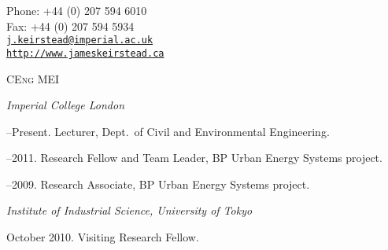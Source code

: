 \documentclass[11pt,a4paper]{article}
\makeatletter
\def\myemail{j.keirstead@imperial.ac.uk}
\def\myweb{http://www.jameskeirstead.ca}
\def\myphone{+44 (0) 207 594 6010}
\def\myfax{+44 (0) 207 594 5934}
\makeatother
\begin{document}
\begin{minipage}[t]{2.95in}
\end{minipage}
\hfill     
\hfill
\begin{minipage}[t]{1.7in}
  \flushright \footnotesize Phone: \myphone \\ 
  Fax: \myfax  \\ 
  {\scriptsize  \texttt{\href{mailto:\myemail}{\myemail}}} \\
  {\scriptsize  \texttt{\href{\myweb}{\myweb}}}
\end{minipage}


\bigskip

\bigskip

 {\scriptsize \textsc{CEng MEI}}
\reversemarginpar
\raggedright

\bigskip

\bigskip


\noindent{}%
%
\emph{Imperial College London \vspace{0.01in}}

--Present. Lecturer, Dept.\ of Civil and Environmental Engineering.      

--2011. Research Fellow and Team Leader, BP Urban Energy Systems project.

--2009. Research Associate, BP Urban Energy Systems project. \vspace{0.02in}

\medskip

\emph{Institute of Industrial Science, University of Tokyo \vspace{0.01in}}

\ind October 2010.  Visiting Research Fellow.

\bigskip
\end{document}
